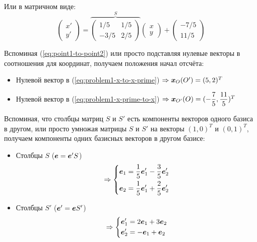 \documentclass[a4paper,12pt]{article}
\begin{document}
\begin{solution}
    Или в матричном виде:
    \begin{equation}\label{eq:problem1-x-prime-to-x}
      \begin{pmatrix}
        x'\\
        y'
      \end{pmatrix}
      = \overbrace{\begin{pmatrix}
        1/5 & 1/5\\
        -3/5 & 2/5
      \end{pmatrix}}^{S}
      \begin{pmatrix}
        x\\
        y
      \end{pmatrix}
      + \begin{pmatrix}
        -7/5\\
        11/5
      \end{pmatrix}
    \end{equation}
    
    
    Вспоминая (\ref{eq:point1-to-point2}) или просто подставляя нулевые векторы в соотношения для координат, получаем положения начал отсчёта:
    \begin{itemize}
      \item Нулевой вектор в (\ref{eq:problem1-x-to-x-prime}) $\Rightarrow \boldsymbol x_O(O') = (5, 2)^T$
      \item Нулевой вектор в (\ref{eq:problem1-x-prime-to-x}) $\Rightarrow \boldsymbol x_{O'}(O) = (-\dfrac{7}{5}, \dfrac{11}{5})^T$
    \end{itemize}
    
    Вспоминая, что столбцы матриц $S$ и $S'$ есть компоненты векторов одного базиса в другом, или просто умножая матрицы $S$ и $S'$ на векторы $(1, 0)^T$ и $(0, 1)^T$, получаем компоненты одних базисных векторов в другом базисе:
    \begin{itemize}
      \item Столбцы $S$ ($\bds e \hm= \bds e' S$)
        \[
          \Rightarrow \left\{
            \begin{aligned}
              &\boldsymbol e_1 = \frac{1}{5} \boldsymbol e_1' - \frac{3}{5} \boldsymbol e_2'\\
              &\boldsymbol e_2 = \frac{1}{5} \boldsymbol e_1' + \frac{2}{5} \boldsymbol e_2'
            \end{aligned}
          \right.
        \]
      \item Столбцы $S'$ ($\bds e' \hm= \bds e S'$)
        \[
          \Rightarrow \left\{
            \begin{aligned}
              &\boldsymbol e_1' = 2 \boldsymbol e_1 + 3 \boldsymbol e_2\\
              &\boldsymbol e_2' = -\boldsymbol e_1 + \boldsymbol e_2
            \end{aligned}
          \right.
        \]
    \end{itemize}
  \end{solution}
  
\end{document}
